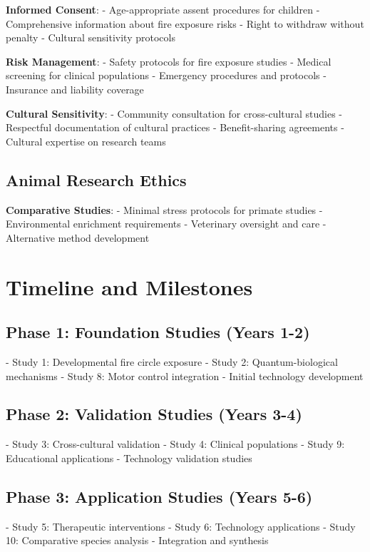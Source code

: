 \documentclass[12pt]{article}
\begin{document}
\textbf{Informed Consent}:
- Age-appropriate assent procedures for children
- Comprehensive information about fire exposure risks
- Right to withdraw without penalty
- Cultural sensitivity protocols

\textbf{Risk Management}:
- Safety protocols for fire exposure studies
- Medical screening for clinical populations
- Emergency procedures and protocols
- Insurance and liability coverage

\textbf{Cultural Sensitivity}:
- Community consultation for cross-cultural studies
- Respectful documentation of cultural practices
- Benefit-sharing agreements
- Cultural expertise on research teams

\subsection{Animal Research Ethics}

\textbf{Comparative Studies}:
- Minimal stress protocols for primate studies
- Environmental enrichment requirements
- Veterinary oversight and care
- Alternative method development

\section{Timeline and Milestones}

\subsection{Phase 1: Foundation Studies (Years 1-2)}
- Study 1: Developmental fire circle exposure
- Study 2: Quantum-biological mechanisms
- Study 8: Motor control integration
- Initial technology development

\subsection{Phase 2: Validation Studies (Years 3-4)}
- Study 3: Cross-cultural validation
- Study 4: Clinical populations
- Study 9: Educational applications
- Technology validation studies

\subsection{Phase 3: Application Studies (Years 5-6)}
- Study 5: Therapeutic interventions
- Study 6: Technology applications
- Study 10: Comparative species analysis
- Integration and synthesis
\end{document}
